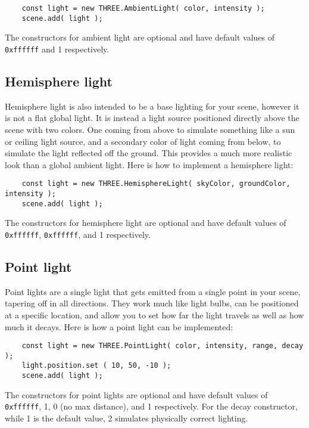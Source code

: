 \documentclass[10pt,final,journal,compsoc]{IEEEtran}
\begin{document}
    \begin{lstlisting}
    const light = new THREE.AmbientLight( color, intensity );
    scene.add( light );
    \end{lstlisting}
    
    The constructors for ambient light are optional and have default values of \verb|0xffffff| and 1 respectively.
    
    \subsection{Hemisphere light}
    Hemisphere light is also intended to be a base lighting for your scene, however it is not a flat global light. It is instead a light source positioned directly above the scene with two colors. One coming from above to simulate something like a sun or ceiling light source, and a secondary color of light coming from below, to simulate the light reflected off the ground. This provides a much more realistic look than a global ambient light. Here is how to implement a hemisphere light:
    
    \begin{lstlisting}
    const light = new THREE.HemisphereLight( skyColor, groundColor, intensity );
    scene.add( light );
    \end{lstlisting}
    
    The constructors for hemisphere light are optional and have default values of \verb|0xffffff|, \verb|0xffffff|, and 1 respectively.
    
    \subsection{Point light}
    Point lights are a single light that gets emitted from a single point in your scene, tapering off in all directions. They work much like light bulbs, can be positioned at a specific location, and allow you to set how far the light travels as well as how much it decays. Here is how a point light can be implemented:
    
    \begin{lstlisting}
    const light = new THREE.PointLight( color, intensity, range, decay );
    light.position.set ( 10, 50, -10 );
    scene.add( light );
    \end{lstlisting}
    
    The constructors for point lights are optional and have default values of \verb|0xffffff|, 1, 0 (no max distance), and 1 respectively. For the decay constructor, while 1 is the default value, 2 simulates physically correct lighting.
    
\end{document}
